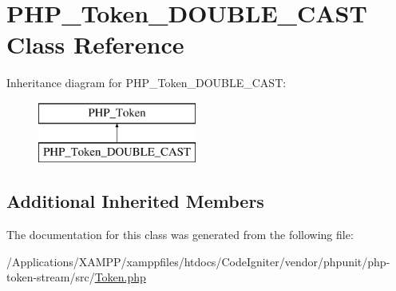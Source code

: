 \hypertarget{class_p_h_p___token___d_o_u_b_l_e___c_a_s_t}{}\section{P\+H\+P\+\_\+\+Token\+\_\+\+D\+O\+U\+B\+L\+E\+\_\+\+C\+A\+ST Class Reference}
\label{class_p_h_p___token___d_o_u_b_l_e___c_a_s_t}
Inheritance diagram for P\+H\+P\+\_\+\+Token\+\_\+\+D\+O\+U\+B\+L\+E\+\_\+\+C\+A\+ST\+:\begin{figure}[H]
\begin{center}
\leavevmode
\includegraphics[height=2.000000cm]{class_p_h_p___token___d_o_u_b_l_e___c_a_s_t}
\end{center}
\end{figure}
\subsection*{Additional Inherited Members}


The documentation for this class was generated from the following file\+:\begin{DoxyCompactItemize}
\item 
/\+Applications/\+X\+A\+M\+P\+P/xamppfiles/htdocs/\+Code\+Igniter/vendor/phpunit/php-\/token-\/stream/src/\mbox{\hyperlink{_token_8php}{Token.\+php}}\end{DoxyCompactItemize}
